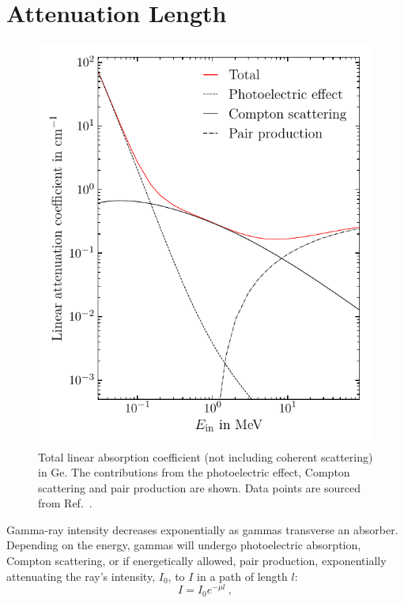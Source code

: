 \section{Attenuation Length}
\begin{figure}[htb]
	\centering
	\includegraphics{figs/gammas/linear_attenuation_ge_width_4in.pdf}
	\caption{Total linear absorption coefficient (not including coherent scattering) in Ge. The contributions from the photoelectric effect, Compton scattering and pair production are shown. Data points are sourced from Ref.~\cite{NIST}.}
	\label{fig:attenuation}
\end{figure}
Gamma-ray intensity decreases exponentially as gammas transverse an absorber. Depending on the energy, gammas will undergo photoelectric absorption, Compton scattering, or if energetically allowed, pair production, exponentially attenuating the ray's intensity, $I_0$, to $I$ in a path of length $l$:
\begin{equation}
	I = I_0e^{-\mu l}~,
\label{eq:attenuation_length}
\end{equation}
